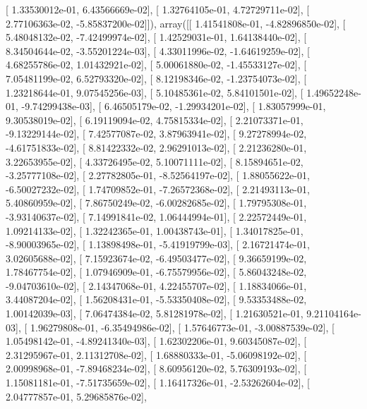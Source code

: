\documentclass{article}
\begin{document}
       [  1.33530012e-01,   6.43566669e-02],
       [  1.32764105e-01,   4.72729711e-02],
       [  2.77106363e-02,  -5.85837200e-02]]), array([[  1.41541808e-01,  -4.82896850e-02],
       [  5.48048132e-02,  -7.42499974e-02],
       [  1.42529031e-01,   1.64138440e-02],
       [  8.34504644e-02,  -3.55201224e-03],
       [  4.33011996e-02,  -1.64619259e-02],
       [  4.68255786e-02,   1.01432921e-02],
       [  5.00061880e-02,  -1.45533127e-02],
       [  7.05481199e-02,   6.52793320e-02],
       [  8.12198346e-02,  -1.23754073e-02],
       [  1.23218644e-01,   9.07545256e-03],
       [  5.10485361e-02,   5.84101501e-02],
       [  1.49652248e-01,  -9.74299438e-03],
       [  6.46505179e-02,  -1.29934201e-02],
       [  1.83057999e-01,   9.30538019e-02],
       [  6.19119094e-02,   4.75815334e-02],
       [  2.21073371e-01,  -9.13229144e-02],
       [  7.42577087e-02,   3.87963941e-02],
       [  9.27278994e-02,  -4.61751833e-02],
       [  8.81422332e-02,   2.96291013e-02],
       [  2.21236280e-01,   3.22653955e-02],
       [  4.33726495e-02,   5.10071111e-02],
       [  8.15894651e-02,  -3.25777108e-02],
       [  2.27782805e-01,  -8.52564197e-02],
       [  1.88055622e-01,  -6.50027232e-02],
       [  1.74709852e-01,  -7.26572368e-02],
       [  2.21493113e-01,   5.40860959e-02],
       [  7.86750249e-02,  -6.00282685e-02],
       [  1.79795308e-01,  -3.93140637e-02],
       [  7.14991841e-02,   1.06444994e-01],
       [  2.22572449e-01,   1.09214133e-02],
       [  1.32242365e-01,   1.00438743e-01],
       [  1.34017825e-01,  -8.90003965e-02],
       [  1.13898498e-01,  -5.41919799e-03],
       [  2.16721474e-01,   3.02605688e-02],
       [  7.15923674e-02,  -6.49503477e-02],
       [  9.36659199e-02,   1.78467754e-02],
       [  1.07946909e-01,  -6.75579956e-02],
       [  5.86043248e-02,  -9.04703610e-02],
       [  2.14347068e-01,   4.22455707e-02],
       [  1.18834066e-01,   3.44087204e-02],
       [  1.56208431e-01,  -5.53350408e-02],
       [  9.53353488e-02,   1.00142039e-03],
       [  7.06474384e-02,   5.81281978e-02],
       [  1.21630521e-01,   9.21104164e-03],
       [  1.96279808e-01,  -6.35494986e-02],
       [  1.57646773e-01,  -3.00887539e-02],
       [  1.05498142e-01,  -4.89241340e-03],
       [  1.62302206e-01,   9.60345087e-02],
       [  2.31295967e-01,   2.11312708e-02],
       [  1.68880333e-01,  -5.06098192e-02],
       [  2.00998968e-01,  -7.89468234e-02],
       [  8.60956120e-02,   5.76309193e-02],
       [  1.15081181e-01,  -7.51735659e-02],
       [  1.16417326e-01,  -2.53262604e-02],
       [  2.04777857e-01,   5.29685876e-02],
\end{document}
